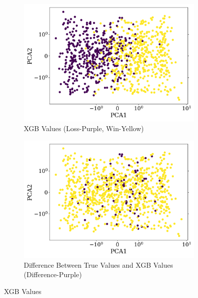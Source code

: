 \documentclass{article}
\begin{document}
\begin{figure}[H]
    \centering
    \begin{subfigure}[t]{0.495\textwidth}
        \centering
        \includegraphics[width=\textwidth]{results/XGB_XGB_Week_6_With_RS_True.png}
        \caption{XGB Values (Loss-Purple, Win-Yellow)}
        \label{fig:xgb_values}
    \end{subfigure}
    \hfill
    \begin{subfigure}[t]{0.495\textwidth}
        \centering
        \includegraphics[width=\textwidth]{results/XGB_Diff_XGB_True_Week_6_With_RS_True.png}
        \caption{Difference Between True Values and XGB Values (Difference-Purple)}
        \label{fig:diff_xgb_first}
    \end{subfigure}
    \caption{XGB Values}
    \label{fig:xgb_values_fig}
\end{figure}
\end{document}
